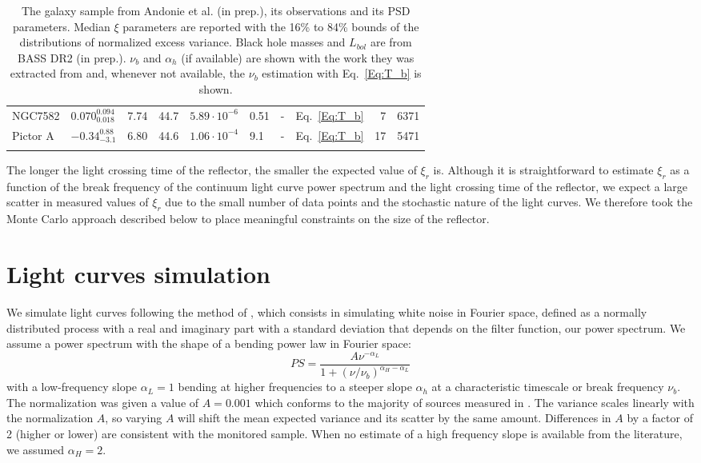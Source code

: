 \begin{footnotesize}
\begin{longtable}{llrrllrlrr}
NGC7582                &  $ 0.070_{0.018}^{0.094} $ &          7.74 &    44.7 & $5.89\cdot10^{-6}$ &         0.51 &        - &                    Eq.~\ref{Eq:T_b} &     7 &     6371 \\
Pictor A                &    $ -0.34_{-3.1}^{0.88} $ &          6.80 &    44.6 & $1.06\cdot10^{-4}$ &          9.1 &        - &                    Eq.~\ref{Eq:T_b} &    17 &     5471 \\
\hline
\caption{The galaxy sample from Andonie et al. (in prep.), its observations and its PSD parameters. Median $\xi$ parameters are reported with the 16\% to 84\% bounds of the distributions of normalized excess variance. Black hole masses and $L_{bol}$ are from BASS DR2 (in prep.). $\nu_b$ and $\alpha_h$ (if available) are shown with the work they was extracted from and, whenever not available, the $\nu_b$ estimation with Eq.~\ref{Eq:T_b} is shown.}\label{tab:gals_obs_par}\\
\end{longtable}
\end{footnotesize}


The longer the light crossing time of the reflector, the smaller the expected value of $\xi_{r}$ is.
Although it is straightforward to estimate $\xi_{r}$ as a function of the break frequency of the continuum light curve power spectrum and the light crossing time of the reflector, we expect a large scatter in measured values of $\xi_{r}$ due to the small number of data points and the stochastic nature of the light curves. We therefore took the Monte Carlo approach described below to place meaningful constraints on the size of the reflector.
 
\section{Light curves simulation}\label{sec:LC_sims}
We simulate light curves following the method of \citet{1995A&A...300..707T}, which consists in simulating white noise in Fourier space, defined as a normally distributed process with a real and imaginary part with a standard deviation that depends on the filter function, our power spectrum. 
We assume a power spectrum with the shape of a bending power law in Fourier space:
\begin{equation}
    PS=\frac{A\nu^{-\alpha_L}}{1+(\nu/\nu_b)^{\alpha_H-\alpha_L}}
\end{equation}
with a low-frequency slope $\alpha_L =1$ bending at higher frequencies to a steeper slope $\alpha_h$ at a characteristic timescale or break frequency $\nu_b$. The normalization was given a value of $A = 0.001$ which conforms to the majority of sources measured in \citet{summons_thesis}. The variance scales linearly with the normalization $A$, so varying $A$ will shift the mean expected variance and its scatter by the same amount. Differences in $A$ by a factor of 2 (higher or lower) are consistent with the monitored sample. When no estimate of a high frequency slope is available from the literature, we assumed $\alpha_H=2$. %

